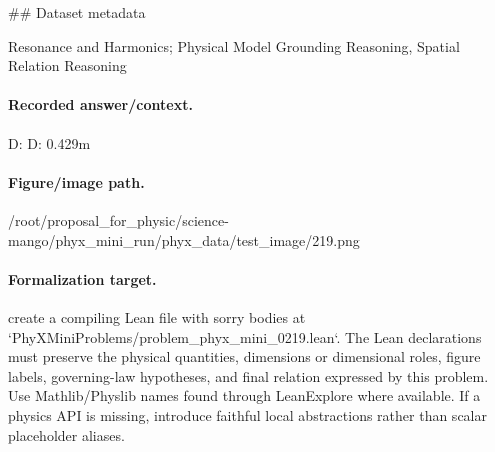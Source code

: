 \#\# Dataset metadata

Resonance and Harmonics; Physical Model Grounding Reasoning, Spatial Relation Reasoning

\paragraph{Recorded answer/context.}
D: D: 0.429m

\paragraph{Figure/image path.}
/root/proposal\_for\_physic/science-mango/phyx\_mini\_run/phyx\_data/test\_image/219.png

\paragraph{Formalization target.}
create a compiling Lean file with sorry bodies at `PhyXMiniProblems/problem\_phyx\_mini\_0219.lean`. The Lean declarations must preserve the physical quantities, dimensions or dimensional roles, figure labels, governing-law hypotheses, and final relation expressed by this problem.
Use Mathlib/Physlib names found through LeanExplore where available. If a physics API is missing, introduce faithful local abstractions rather than scalar placeholder aliases.

